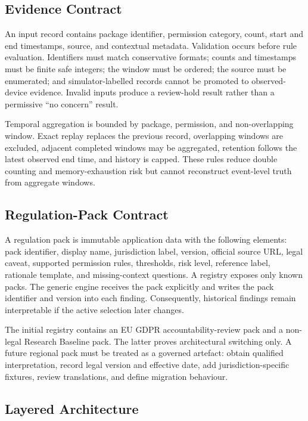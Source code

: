 \subsection{Evidence Contract}

An input record contains package identifier, permission category, count, start and end timestamps, source, and contextual metadata. Validation occurs before rule evaluation. Identifiers must match conservative formats; counts and timestamps must be finite safe integers; the window must be ordered; the source must be enumerated; and simulator-labelled records cannot be promoted to observed-device evidence. Invalid inputs produce a review-hold result rather than a permissive ``no concern'' result.

Temporal aggregation is bounded by package, permission, and non-overlapping window. Exact replay replaces the previous record, overlapping windows are excluded, adjacent completed windows may be aggregated, retention follows the latest observed end time, and history is capped. These rules reduce double counting and memory-exhaustion risk but cannot reconstruct event-level truth from aggregate windows.

\subsection{Regulation-Pack Contract}

A regulation pack is immutable application data with the following elements: pack identifier, display name, jurisdiction label, version, official source URL, legal caveat, supported permission rules, thresholds, risk level, reference label, rationale template, and missing-context questions. A registry exposes only known packs. The generic engine receives the pack explicitly and writes the pack identifier and version into each finding. Consequently, historical findings remain interpretable if the active selection later changes.

The initial registry contains an EU GDPR accountability-review pack and a non-legal Research Baseline pack. The latter proves architectural switching only. A future regional pack must be treated as a governed artefact: obtain qualified interpretation, record legal version and effective date, add jurisdiction-specific fixtures, review translations, and define migration behaviour.

\subsection{Layered Architecture}

